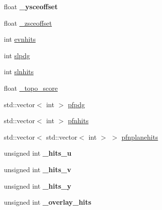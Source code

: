 \begin{DoxyCompactItemize}
\item 
float {\bfseries \+\_\+ysceoffset}\hypertarget{classanalysis_1_1DefaultAnalysis_aa3948474002486f07a07ff52f24976ce}{}\label{classanalysis_1_1DefaultAnalysis_aa3948474002486f07a07ff52f24976ce}

\item 
float \hyperlink{classanalysis_1_1DefaultAnalysis_af2471e0f1bf6cf3c5bec18f830f41c8d}{\+\_\+zsceoffset}
\item 
int \hyperlink{classanalysis_1_1DefaultAnalysis_a32911aea589477a3832a4de8d134696d}{evnhits}
\item 
int \hyperlink{classanalysis_1_1DefaultAnalysis_a9763429d7ed32c67e96d981d14893c06}{slpdg}
\item 
int \hyperlink{classanalysis_1_1DefaultAnalysis_a9f003b22425d9db3b27eabee64700028}{slnhits}
\item 
float \hyperlink{classanalysis_1_1DefaultAnalysis_a950efb6f4e8f1ad6dd00e24bc74002c2}{\+\_\+topo\+\_\+score}
\item 
std\+::vector$<$ int $>$ \hyperlink{classanalysis_1_1DefaultAnalysis_a5d3ad6cd0930367cafe48e485aa19d20}{pfpdg}
\item 
std\+::vector$<$ int $>$ \hyperlink{classanalysis_1_1DefaultAnalysis_a8d010c569e35c153059a6db573b9542d}{pfnhits}
\item 
std\+::vector$<$ std\+::vector$<$ int $>$ $>$ \hyperlink{classanalysis_1_1DefaultAnalysis_a868edc3f02a7f71619edef7ee0d3df5c}{pfnplanehits}
\item 
unsigned int {\bfseries \+\_\+hits\+\_\+u}\hypertarget{classanalysis_1_1DefaultAnalysis_a71d00d09f361b64c3b8491f1f83db0f9}{}\label{classanalysis_1_1DefaultAnalysis_a71d00d09f361b64c3b8491f1f83db0f9}

\item 
unsigned int {\bfseries \+\_\+hits\+\_\+v}\hypertarget{classanalysis_1_1DefaultAnalysis_a0d34f0785933a50dd9692651610b65c5}{}\label{classanalysis_1_1DefaultAnalysis_a0d34f0785933a50dd9692651610b65c5}

\item 
unsigned int {\bfseries \+\_\+hits\+\_\+y}\hypertarget{classanalysis_1_1DefaultAnalysis_a30b699a515887188545764f63babb58d}{}\label{classanalysis_1_1DefaultAnalysis_a30b699a515887188545764f63babb58d}

\item 
unsigned int {\bfseries \+\_\+overlay\+\_\+hits}\hypertarget{classanalysis_1_1DefaultAnalysis_aa4e3c702d047e53f6838d1655b12877a}{}\label{classanalysis_1_1DefaultAnalysis_aa4e3c702d047e53f6838d1655b12877a}


\end{DoxyCompactItemize}
